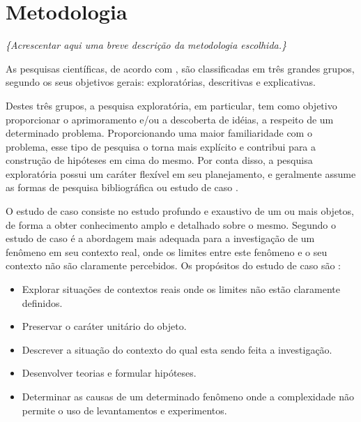 \chapter[Metodologia]{Metodologia}

\textit{\{Acrescentar aqui uma breve descrição da metodologia escolhida.\}}

As pesquisas científicas, de acordo com , são classificadas em três grandes grupos, segundo os seus objetivos gerais: exploratórias, descritivas e explicativas.

Destes três grupos, a pesquisa exploratória, em particular, tem como objetivo proporcionar o aprimoramento e/ou a descoberta de idéias, a respeito de um determinado problema. Proporcionando uma maior familiaridade com o problema, esse tipo de pesquisa o torna mais explícito e contribui para a construção de hipóteses em cima do mesmo. Por conta disso, a pesquisa exploratória possui um caráter flexível em seu planejamento, e geralmente assume as formas de pesquisa bibliográfica ou estudo de caso \cite{gil2002}.

O estudo de caso consiste no estudo profundo e exaustivo de um ou mais objetos, de forma a obter conhecimento amplo e detalhado sobre o mesmo. Segundo  o estudo de caso é a abordagem mais adequada para a investigação de um fenômeno em seu contexto real, onde os limites entre este fenômeno e o seu contexto não são claramente percebidos. Os propósitos do estudo de caso são \cite{gil2002}:

\begin{itemize}
\item Explorar situações de contextos reais onde os limites não estão claramente definidos.
\item Preservar o caráter unitário do objeto.
\item Descrever a situação do contexto do qual esta sendo feita a investigação.
\item Desenvolver teorias e formular hipóteses.
\item Determinar as causas de um determinado fenômeno onde a complexidade não permite o uso de levantamentos e experimentos.
\end{itemize}

